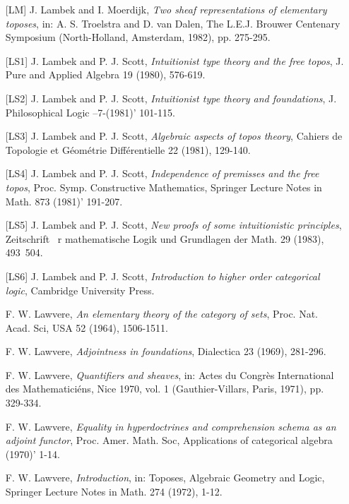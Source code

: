 \begin{enumerate}[leftmargin=*, widest=8888, align=left]
\item[{[LM]}] J. Lambek and I. Moerdijk, {\em Two sheaf representations of elementary
toposes}, in: A. S. Troelstra and D. van Dalen, The L.E.J.
Brouwer Centenary Symposium (North-Holland, Amsterdam, 1982),
pp. 275-295.

\item[{[LS1]}] J. Lambek and P. J. Scott, {\em Intuitionist type theory and the free topos},
J. Pure and Applied Algebra 19 (1980), 576-619.

\item[{[LS2]}] J. Lambek and P. J. Scott, {\em Intuitionist type theory and foundations}, J. Philosophical Logic
--7-(1981)' 101-115.

\item[{[LS3]}] J. Lambek and P. J. Scott, {\em Algebraic aspects of topos theory}, Cahiers de Topologie et
G\'eom\'etrie Diff\'erentielle 22 (1981), 129-140.

\item[{[LS4]}] J. Lambek and P. J. Scott, {\em Independence of premisses and the free topos}, Proc. Symp.
Constructive Mathematics, Springer Lecture Notes in Math. 873
(1981)' 191-207.

\item[{[LS5]}] J. Lambek and P. J. Scott, {\em New proofs of some intuitionistic principles}, Zeitschrift
~r mathematische Logik und Grundlagen der Math. 29 (1983), 493~504.

\item[{[LS6]}] J. Lambek and P. J. Scott, {\em Introduction to higher order categorical logic}, Cambridge
University Press.

\item[] F. W. Lawvere, {\em An elementary theory of the category of sets}, Proc. Nat.
Acad. Sci, USA 52 (1964), 1506-1511.

\item[] F. W. Lawvere, {\em Adjointness in foundations}, Dialectica 23 (1969), 281-296.

\item[] F. W. Lawvere, {\em Quantifiers and sheaves}, in: Actes du Congr\`es International des
Mathematici\'ens, Nice 1970, vol. 1 (Gauthier-Villars, Paris, 1971),
pp. 329-334.

\item[] F. W. Lawvere, {\em Equality in hyperdoctrines and comprehension schema as an adjoint
functor}, Proc. Amer. Math. Soc, Applications of categorical algebra
(1970)' 1-14.

\item[] F. W. Lawvere, {\em Introduction}, in: Toposes, Algebraic Geometry and Logic,
Springer Lecture Notes in Math. 274 (1972), 1-12.


\end{enumerate}
